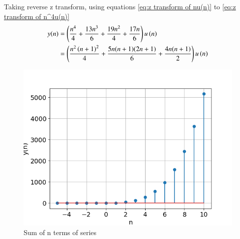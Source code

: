 \documentclass[journal,12pt,twocolumn]{IEEEtran}
\theoremstyle{remark}
\begin{document}
    Taking reverse z transform, using equations \eqref{eq:z transform of nu(n)} to \eqref{eq:z transform of n^4u(n)}
    \begin{align}
        y(n) &= \left(\frac{n^4}{4} + \frac{13n^3}{6} + \frac{19n^2}{4} + \frac{17n}{6}\right) u\left(n\right)\\
        &= \left(\frac{n^2\left(n+1\right)^2}{4} + \frac{5n(n+1)(2n+1)}{6} 
        + \frac{4n(n+1)}{2}\right) u\left(n\right)
    \end{align}
    \begin{figure}[!h] 
    \centering
    \includegraphics[width=\columnwidth]{figs/sumplot.png}
    \caption{Sum of n terms of series}
    \label{fig:Graph1_math.11.9.4.8}
    \end{figure}
\end{document}

